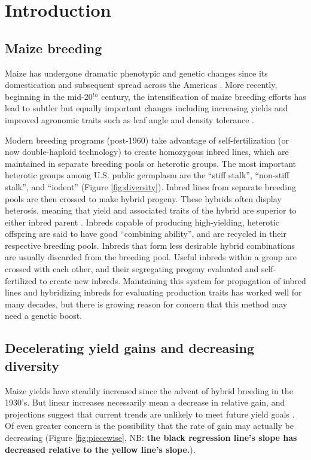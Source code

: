 \documentclass[12pt]{article}
\begin{document}
\section*{Introduction}
\label{sec:introduction}

\subsection*{Maize breeding}
Maize has undergone dramatic phenotypic and genetic changes since its domestication and subsequent spread across the Americas \citep{daFonseca:2015ey,Doebley:2004ce}. More recently, beginning in the mid-20$^{th}$ century, the intensification of maize breeding efforts has lead to subtler but equally important changes including increasing yields and improved agronomic traits such as leaf angle and density tolerance \citep{duvick2005contribution}. 

Modern breeding programs (post-1960) take advantage of self-fertilization (or now double-haploid technology) to create homozygous inbred lines, which are maintained in separate breeding pools or heterotic groups.
The most important heterotic groups among U.S. public germplasm are the ``stiff stalk'', ``non-stiff stalk'', and ``iodent'' (Figure \ref{fig:diversity}).
Inbred lines from separate breeding pools are then crossed to make hybrid progeny.  
These hybrids often display heterosis, meaning that yield and associated traits of the hybrid are superior to  either inbred parent \citep{Springer:2007bj}.  
Inbreds capable of producing high-yielding, heterotic offspring are said to have good ``combining ability'', and are recycled in their respective breeding pools.
Inbreds that form less desirable hybrid combinations are usually discarded from the breeding pool. 
Useful inbreds within a group are crossed with each other, and their segregating progeny evaluated and self-fertilized to create new inbreds. 
Maintaining this system for propagation of inbred lines and hybridizing inbreds for evaluating production traits has worked well for many decades, but there is growing reason for concern that this method may need a genetic boost. 

\subsection*{Decelerating yield gains and decreasing diversity} 

Maize yields have steadily increased since the advent of hybrid breeding in the 1930's.
But linear increases necessarily mean a decrease in relative gain, and projections suggest that current trends are unlikely to meet future yield goals \citep{grassini2013distinguishing}. 
Of even greater concern is the possibility that the rate of gain may actually be decreasing (Figure \ref{fig:piecewise}, NB: \textbf{the black regression line's slope has decreased relative to the yellow line's slope.}).
\end{document}
